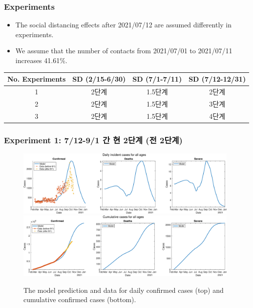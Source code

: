 \documentclass[aspectratio=169, 9pt, xcolor=dvipsnames]{beamer}
\begin{document}
	\begin{frame}\frametitle{Experiments}
	    \begin{itemize}
	    	\item The social distancing effects after 2021/07/12 are assumed differently in experiments.
	    	\item We assume that the number of contacts from 2021/07/01 to 2021/07/11 increases 41.61\%.
	    \end{itemize}
	    \begin{table}
	    	\begin{tabular}{cccc}
	    		\toprule
	    		\textbf{No. Experiments} & \textbf{SD (2/15-6/30)} & \textbf{SD (7/1-7/11)} & \textbf{SD (7/12-12/31)} \\
	    		\midrule
	 			1 & 2단계 & 1.5단계 & \textcolor{NavyBlue}{2단계} \\
	 			2 & 2단계 & 1.5단계 & \textcolor{NavyBlue}{3단계} \\
	 			3 & 2단계 & 1.5단계 & \textcolor{NavyBlue}{4단계} \\
	    		\bottomrule
	    	\end{tabular}
	    \end{table}
	\end{frame}

	\begin{frame}\frametitle{Experiment 1: 7/12-9/1 간 현 2단계 (전 2단계)}
	    \begin{figure}
	    	\centering
	    	\includegraphics[width=11cm]{../results/predict_exp_1_sd3_same_school_same/daily_all_age.eps}
	    	\includegraphics[width=11cm]{../results/predict_exp_1_sd3_same_school_same/cumul_all_age.eps}
	    	\caption{The model prediction and data for daily confirmed cases (top) and cumulative confirmed cases (bottom).}
	    \end{figure}
	\end{frame}
\end{document}
